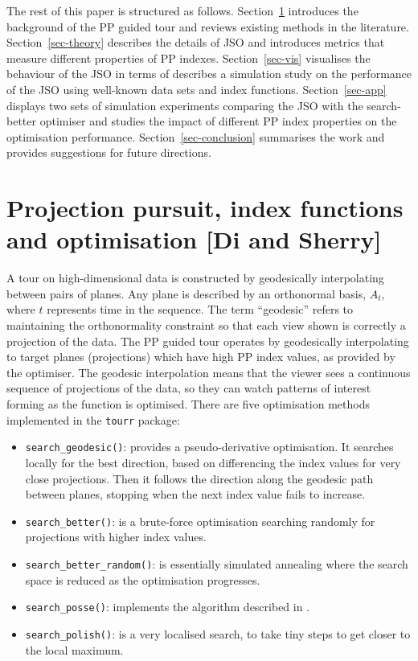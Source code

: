 \documentclass[
  number,
  preprint,
  3p]{elsarticle}
\providecommand{\tightlist}{%
  \setlength{\itemsep}{0pt}\setlength{\parskip}{0pt}}\usepackage{longtable,booktabs,array}
\begin{document}
The rest of this paper is structured as follows.
Section~\ref{sec-background} introduces the background of the PP guided
tour and reviews existing methods in the literature.
Section~\ref{sec-theory} describes the details of JSO and introduces
metrics that measure different properties of PP indexes.
Section~\ref{sec-vis} visualises the behaviour of the JSO in terms of
describes a simulation study on the performance of the JSO using
well-known data sets and index functions. Section~\ref{sec-app} displays
two sets of simulation experiments comparing the JSO with the
search-better optimiser and studies the impact of different PP index
properties on the optimisation performance. Section~\ref{sec-conclusion}
summarises the work and provides suggestions for future directions.

\hypertarget{sec-background}{%
\section{Projection pursuit, index functions and optimisation {[}Di and
Sherry{]}}\label{sec-background}}

A tour on high-dimensional data is constructed by geodesically
interpolating between pairs of planes. Any plane is described by an
orthonormal basis, \(A_t\), where \(t\) represents time in the sequence.
The term ``geodesic'' refers to maintaining the orthonormality
constraint so that each view shown is correctly a projection of the
data. The PP guided tour operates by geodesically interpolating to
target planes (projections) which have high PP index values, as provided
by the optimiser. The geodesic interpolation means that the viewer sees
a continuous sequence of projections of the data, so they can watch
patterns of interest forming as the function is optimised. There are
five optimisation methods implemented in the \texttt{tourr} package:

\begin{itemize}
\tightlist
\item
  \texttt{search\_geodesic()}: provides a pseudo-derivative
  optimisation. It searches locally for the best direction, based on
  differencing the index values for very close projections. Then it
  follows the direction along the geodesic path between planes, stopping
  when the next index value fails to increase.
\item
  \texttt{search\_better()}: is a brute-force optimisation searching
  randomly for projections with higher index values.
\item
  \texttt{search\_better\_random()}: is essentially simulated annealing
  \citep{Bertsimas93} where the search space is reduced as the
  optimisation progresses.
\item
  \texttt{search\_posse()}: implements the algorithm described in
  \citet{posse95}.
\item
  \texttt{search\_polish()}: is a very localised search, to take tiny
  steps to get closer to the local maximum.
\end{itemize}
\end{document}
